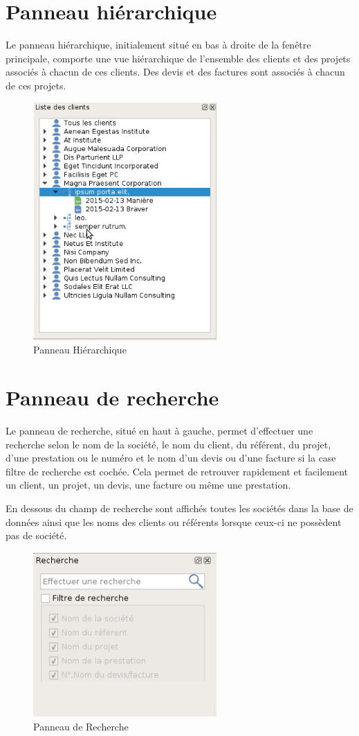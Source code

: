 \section{Panneau hiérarchique}
Le panneau hiérarchique, initialement situé en bas à droite de la fenêtre principale, comporte une vue hiérarchique de l'ensemble des clients et des projets associés à chacun de ces clients. Des devis et des factures sont associés à chacun de ces projets.

\begin{figure}[H]
	\centering
	\includegraphics[width=7cm]{screens/dockHierarchique.png}
	\caption{Panneau Hiérarchique}
	\label{fig:dockHierarchique}
\end{figure}

\section{Panneau de recherche}
Le panneau de recherche, situé en haut à gauche, permet d’effectuer une recherche selon le nom de la société, le nom du client, du référent, du projet, d'une prestation ou le numéro et le nom d'un devis ou d'une facture si la case filtre de recherche est cochée. Cela permet de retrouver rapidement et facilement un client, un projet, un devis, une facture ou même une prestation.

En dessous du champ de recherche sont affichés toutes les sociétés dans la base de données ainsi que les noms des clients ou référents lorsque ceux-ci ne possèdent pas de société.

\begin{figure}[H]
	\centering
	\includegraphics[width=7cm]{screens/dockRecherche.png}
	\caption{Panneau de Recherche}
	\label{fig:dockRecherche}
\end{figure}


